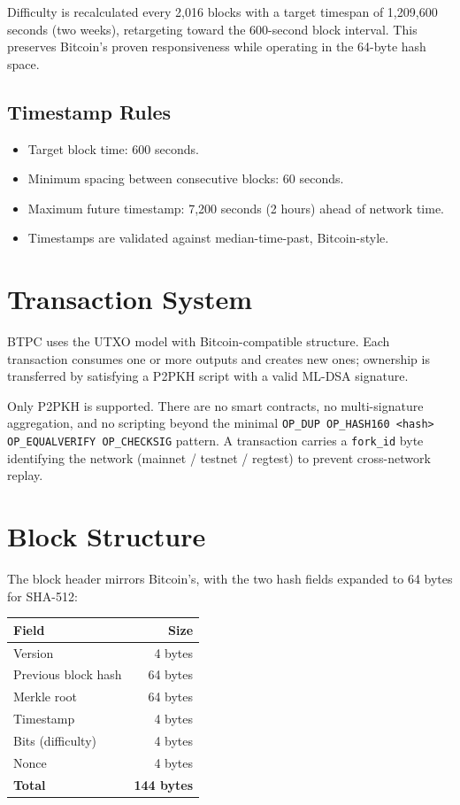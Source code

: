 \documentclass[11pt,a4paper]{article}
\begin{document}
Difficulty is recalculated every 2{,}016 blocks with a target timespan of 1{,}209{,}600 seconds (two weeks), retargeting toward the 600-second block interval. This preserves Bitcoin's proven responsiveness while operating in the 64-byte hash space.

\subsection{Timestamp Rules}

\begin{itemize}[leftmargin=1.5em,itemsep=2pt]
\item Target block time: 600 seconds.
\item Minimum spacing between consecutive blocks: 60 seconds.
\item Maximum future timestamp: 7{,}200 seconds (2 hours) ahead of network time.
\item Timestamps are validated against median-time-past, Bitcoin-style.
\end{itemize}

\section{Transaction System}

BTPC uses the UTXO model with Bitcoin-compatible structure. Each transaction consumes one or more outputs and creates new ones; ownership is transferred by satisfying a P2PKH script with a valid ML-DSA signature.

Only P2PKH is supported. There are no smart contracts, no multi-signature aggregation, and no scripting beyond the minimal \texttt{OP\_DUP OP\_HASH160 \textless{}hash\textgreater{} OP\_EQUALVERIFY OP\_CHECKSIG} pattern. A transaction carries a \texttt{fork\_id} byte identifying the network (mainnet / testnet / regtest) to prevent cross-network replay.

\section{Block Structure}

The block header mirrors Bitcoin's, with the two hash fields expanded to 64 bytes for SHA-512:

\begin{center}
\begin{tabular}{lr}
\toprule
\textbf{Field} & \textbf{Size} \\
\midrule
Version & 4 bytes \\
Previous block hash & 64 bytes \\
Merkle root & 64 bytes \\
Timestamp & 4 bytes \\
Bits (difficulty) & 4 bytes \\
Nonce & 4 bytes \\
\midrule
\textbf{Total} & \textbf{144 bytes} \\
\bottomrule
\end{tabular}
\end{center}
\end{document}
